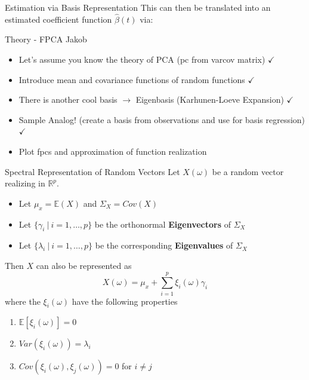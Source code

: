 \documentclass{beamer}
\begin{document}
	\begin{frame}{Estimation via Basis Representation}
		This can then be translated into an estimated coefficient function $\hat{\beta}(t)$ via:
	\end{frame}

	\begin{frame}{Theory - FPCA}
		Jakob
		\begin{itemize}
			\item Let's assume you know the theory of PCA (pc from varcov matrix) $\checkmark$
			\item Introduce mean and covariance functions of random functions $\checkmark$
			\item There is another cool basis $\rightarrow$ Eigenbasis (Karhunen-Loeve Expansion) $\checkmark$
			\item Sample Analog! (create a basis from observations and use for basis regression) $\checkmark$
			\item Plot fpcs and approximation of function realization
		\end{itemize}
	\end{frame}

	\begin{frame}{Spectral Representation of Random Vectors}
		Let $X(\omega)$ be a random vector realizing in $\mathbb{R}^p$.

		\begin{itemize}
			\item Let $\mu_x = \mathbb{E}(X)$ and $\Sigma_X = Cov(X)$
			\item Let $\{\gamma_i \: \vert \: i = 1, \dots, p\}$ be the orthonormal \textbf{Eigenvectors} of $\Sigma_X$
			\item Let $\{\lambda_i \: \vert \: i = 1, \dots, p\}$ be the corresponding \textbf{Eigenvalues} of $\Sigma_X$
		\end{itemize}
	
		\vspace{0.2cm}
		Then $X$ can also be represented as
		$$X(\omega) = \mu_x + \sum_{i = 1}^{p} \xi_i(\omega) \gamma_i$$
		where the $\xi_i(\omega)$ have the following properties
		
		\begin{multicols}{2}
			\begin{enumerate}
				\item $\mathbb{E}[\xi_i(\omega)] = 0$
				\item $Var(\xi_i(\omega)) = \lambda_i$
				\item $Cov(\xi_i(\omega), \xi_j(\omega)) = 0$ for $i \neq j$
			\end{enumerate}
		\end{multicols}
	\end{frame}
\end{document}
